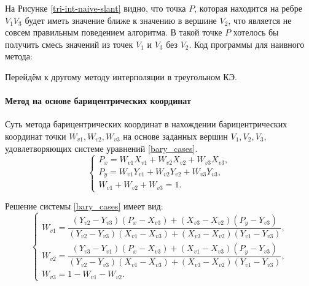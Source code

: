 На Рисунке \ref{tri-int-naive-slant} видно, что точка $P$, которая находится на ребре $V_1 V_3$ будет иметь значение ближе к значению в вершине $V_2$, что является не совсем правильным поведением алгоритма. В такой точке $P$ хотелось бы получить смесь значений из точек $V_1$ и $V_3$ без $V_2$. 
Код программы для наивного метода:

Перейдём к другому методу интерполяции в треугольном КЭ.

\paragraph{Метод на основе барицентрических координат}
Суть метода барицентрических координат в нахождении барицентрических координат точки $W_{v1}, W_{v2}, W_{v3}$ на основе заданных вершин $V_1, V_2, V_3$, удовлетворяющих системе уравнений \eqref{bary_cases}. \cite{trig_interpolate}
\begin{equation}\label{bary_cases}
	\begin{cases}
		P_x = W_{v1}X_{v1} + W_{v2}X_{v2} + W_{v3}X_{v3},\\
		P_y = W_{v1}Y_{v1} + W_{v2}Y_{v2} + W_{v3}Y_{v3},\\
		W_{v1} + W_{v2} + W_{v3} = 1.
	\end{cases}
\end{equation}

Решение системы \eqref{bary_cases} имеет вид:
\begin{equation*}
	\begin{cases}
		W_{v1}=\dfrac{(Y_{v2}-Y_{v3})(P_{x}-X_{v3})+(X_{v3}-X_{v2})(P_{y}-Y_{v3})}{(Y_{v2}-Y_{v3})(X_{v1}-X_{v3})+(X_{v3}-X_{v2})(Y_{v1}-Y_{v3})},\\[15pt]
		W_{v2}=\dfrac{(Y_{v3}-Y_{v1})(P_{x}-X_{v3})+(X_{v1}-X_{v3})(P_{y}-Y_{v3})}{(Y_{v2}-Y_{v3})(X_{v1}-X_{v3})+(X_{v3}-X_{v2})(Y_{v1}-Y_{v3})},\\[15pt]
		W_{v3}=1 - W_{v1} - W_{v2}.
	\end{cases}
\end{equation*}

